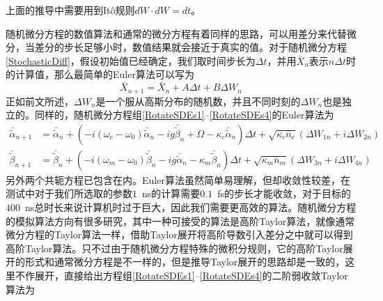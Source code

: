上面的推导中需要用到It\^o规则$dW \cdot dW=dt$。

随机微分方程的数值算法和通常的微分方程有着同样的思路，可以用差分来代替微分，当差分的步长足够小时，数值结果就会接近于真实的值。对于随机微分方程\eqref{StochasticDiff}，假设初始值已经确定，我们取时间步长为$\Delta t$，并用$\bar{X}_n$表示$n\Delta t$时的计算值，那么最简单的Euler算法可以写为
\begin{equation}
\bar{X}_{n+1}=\bar{X}_n + A \Delta t + B \Delta W_n
\end{equation}
正如前文所述，$\Delta W_n$是一个服从高斯分布的随机数，并且不同时刻的$\Delta W_n$也是独立的。同样的，随机微分方程组\eqref{RotateSDEs1}--\eqref{RotateSDEs4}的Euler算法为
\begin{equation}
\begin{aligned}
\bar{\tilde{\alpha}}_{n+1}&=\bar{\tilde{\alpha}}_{n}+(-i(\omega_{c}-\omega_{0})\bar{\tilde{\alpha}}_{n}-ig\bar{\tilde{\beta}}_{n}+\Omega -\kappa_{c}\bar{\tilde{\alpha}}_{n})\Delta t+\sqrt{\kappa_c\overline{n}_{c}}(\Delta{W}_{1n}+i\Delta{W}_{2n}) \\
\bar{\tilde{\beta}}_{n+1}&=\bar{\tilde{\beta}}_{n}+(-i(\omega_{m}-\omega_{0})\bar{\tilde{\beta}}_{n}-ig\bar{\tilde{\alpha}}_{n}-\kappa_{m}\bar{\tilde{\beta}}_{n})\Delta t+\sqrt{\kappa_m\overline{n}_{m}}(\Delta{W}_{3n}+i\Delta{W}_{4n})
\end{aligned}
\end{equation}
另外两个共轭方程已包含在内。Euler算法虽然简单易理解，但却收敛性较差，在测试中对于我们所选取的参数$1$~ns的计算需要$0.1$~fs的步长才能收敛，对于目标的$400$~ns总时长来说计算机时过于巨大，因此我们需要更高效的算法。随机微分方程的模拟算法方向有很多研究\cite{}，其中一种可接受的算法是高阶Taylor算法，就像通常微分方程的Taylor算法一样，借助Taylor展开将高阶导数引入差分之中就可以得到高阶Taylor算法。只不过由于随机微分方程特殊的微积分规则，它的高阶Taylor展开的形式和通常微分方程是不一样的，但是推导Taylor展开的思路却是一致的，这里不作展开，直接给出方程组\eqref{RotateSDEs1}--\eqref{RotateSDEs4}的二阶弱收敛Taylor算法为
